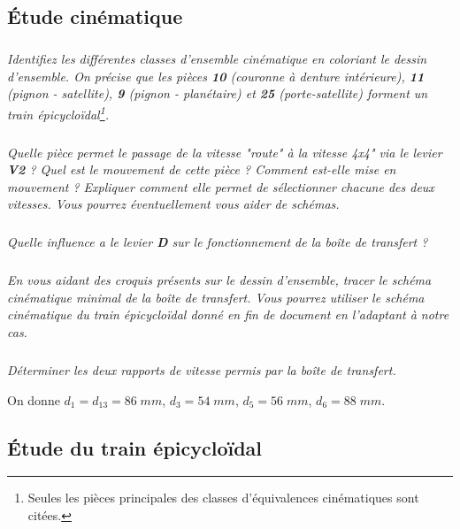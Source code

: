 \documentclass[10pt]{article}
\begin{document}
\subsection{Étude cinématique}

\subparagraph{}
\textit{Identifiez les différentes classes d'ensemble cinématique en coloriant le dessin d'ensemble. On précise que les pièces \textbf{10} (couronne à denture intérieure), \textbf{11}  (pignon - satellite), \textbf{9} (pignon - planétaire) et \textbf{25} (porte-satellite) forment un train épicycloïdal\footnote{Seules les pièces principales des classes d'équivalences cinématiques sont citées.}.}


\subparagraph{}
\textit{Quelle pièce permet le passage de la vitesse "route" à la vitesse 4x4" via le levier \textbf{V2} ? Quel est le mouvement de cette pièce ? Comment est-elle mise en mouvement ? Expliquer comment elle permet de sélectionner chacune des deux vitesses. Vous pourrez éventuellement vous aider de schémas.}

\subparagraph{}
\textit{Quelle influence a le levier \textbf{D} sur le fonctionnement de la boîte de transfert ?}


\subparagraph{}
\textit{En vous aidant des croquis présents sur le dessin d'ensemble, tracer le schéma cinématique minimal de la boîte de transfert. Vous pourrez utiliser le schéma cinématique du train épicycloïdal donné en fin de document en l'adaptant à notre cas.}


\subparagraph{}
\textit{Déterminer les deux rapports de vitesse permis par la boîte de transfert.}

On donne $d_1 = d_{13} = 86\; mm$, $d_3=54\; mm$, $d_5=56\; mm$, $d_6=88\; mm$.


\subsection{Étude du train épicycloïdal}
\end{document}
